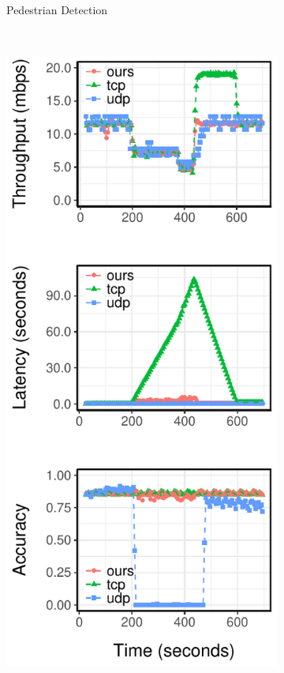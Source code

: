 \begin{figure}
\begin{subfigure}[t]{0.33\textwidth}
    \caption{Pedestrian Detection}
    \label{fig:pd-runtime}
  \end{subfigure}
  ~
  \begin{subfigure}[t]{0.33\textwidth}
    \centering
    \includegraphics[width=\textwidth]{figures/ped-runtime-verticle.pdf}

\end{subfigure}
\end{figure}

